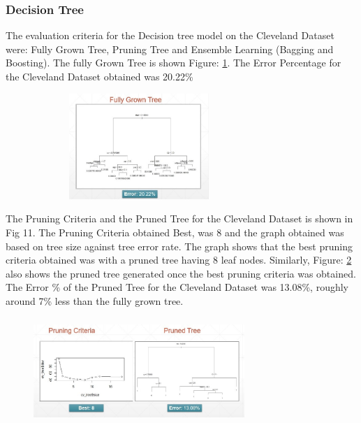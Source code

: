 \documentclass[conference]{IEEEtran}
\begin{document}
\subsubsection{Decision Tree}
The evaluation criteria for the Decision tree model on the Cleveland Dataset were: Fully Grown Tree, Pruning Tree and Ensemble Learning (Bagging and Boosting). The fully Grown Tree is shown Figure: \ref{fig10}. The Error Percentage for the Cleveland Dataset obtained was 20.22\% 
\begin{figure}
	\centering
	\includegraphics[height=4cm, width=8cm]{images/Fig10}
	\linebreak
	\label{fig10}
	\end{figure}

The Pruning Criteria and the Pruned Tree for the Cleveland Dataset is shown in Fig 11. The Pruning Criteria obtained Best, was 8 and the graph obtained was based on tree size against tree error rate. The graph shows that the best pruning criteria obtained was with a pruned tree having 8 leaf nodes. Similarly, Figure: \ref{fig11} also shows the pruned tree generated once the best pruning criteria was obtained. The Error \% of the Pruned Tree for the Cleveland Dataset was 13.08\%, roughly around 7\% less than the fully grown tree.\\

\begin{figure}
	\centering
	\includegraphics[height=4cm, width=8cm]{images/Fig11}
	\label{fig11}
\end{figure}
\end{document}
